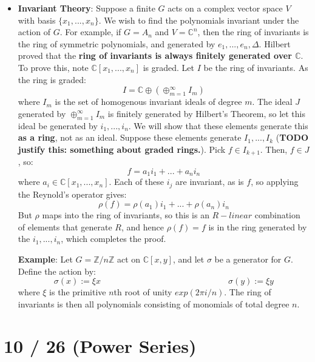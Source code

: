 \documentclass[11pt, oneside]{amsart}   	%
\theoremstyle{definition}
\begin{document}
\begin{itemize}
	\item \textbf{Invariant Theory}: Suppose a finite $G$ acts on a complex vector space $V$ with basis $\{x_1, ..., x_n\}$. We wish to find the 
	polynomials invariant under the action of $G$. For example, if $G = A_n$ and $V = \mathbb C^n$, then the ring of invariants is the ring of symmetric 
	polynomials, and generated by $e_1, ..., e_n, \Delta$. Hilbert proved that the \textbf{ring of invariants is always finitely generated over $\mathbb C$}. 
	To prove this, note $\mathbb C[x_1, ..., x_n]$ is graded. Let $I$ be the ring of invariants. As the ring is graded:
	$$
		I = \mathbb C \oplus (\oplus_{m = 1}^\infty I_m)
	$$
	where $I_m$ is the set of homogenous invariant ideals of degree $m$. The ideal $J$ generated by $\oplus_{m = 1}^\infty I_m$ is finitely generated by 
	Hilbert's Theorem, so let this ideal be generated by $i_1, ..., i_n$. We will show that these elements generate this \textbf{as a ring}, not as an ideal. 
	Suppose these elements generate $I_1, ..., I_k$ (\textbf{TODO justify this: something about graded rings.}). Pick $f\in I_{k + 1}$. Then, $f\in J$, so:
	$$
		f = a_1i_1 + ... + a_ni_n
	$$
	where $a_i\in\mathbb C[x_1, ..., x_n]$. Each of these $i_j$ are invariant, as is $f$, so applying the Reynold's operator gives:
	$$
		\rho(f) = \rho(a_1)i_1 + ... + \rho(a_n)i_n
	$$
	But $\rho$ maps into the ring of invariants, so this is an $R-linear$ combination of elements that generate $R$, and hence $\rho(f) = f$ is in the 
	ring generated by the $i_1, ..., i_n$, which completes the proof. 
	
	\textbf{Example}: Let $G = \mathbb Z / n\mathbb Z$ act on $\mathbb C[x, y]$, and let $\sigma$ be a generator for $G$. Define the action by:
	$$
		\sigma(x) := \xi x \;\;\;\;\;\;\;\;\;\;\;\;\;\;\;\;\;\;\;\;\;\;\;\;\;\;\;\;\;\;\;\;\;\;\;\;\;\;\;\;\;\;\;\;\;\;\;\;\;\;\;\;\;\; \sigma(y) := \xi y
	$$
	where $\xi$ is the primitive $n$th root of unity $exp(2\pi i/n)$. The ring of invariants is then all polynomials consisting of monomials of total degree 
	$n$. 
	
\end{itemize}

\section{10 / 26 (Power Series)}
\end{document}
